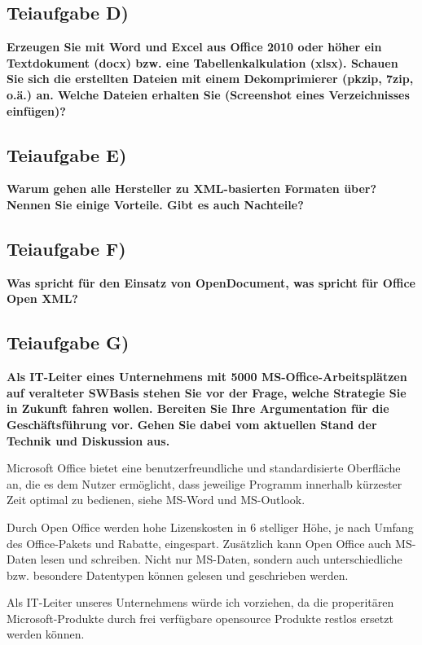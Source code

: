 \subsection{Teiaufgabe D)}
\textbf{Erzeugen Sie mit Word und Excel aus Office 2010 oder höher ein Textdokument (docx)
bzw. eine Tabellenkalkulation (xlsx). Schauen Sie sich die erstellten Dateien mit einem
Dekomprimierer (pkzip, 7zip, o.ä.) an. Welche Dateien erhalten Sie (Screenshot eines
Verzeichnisses einfügen)?}



\subsection{Teiaufgabe E)}
\textbf{Warum gehen alle Hersteller zu XML-basierten Formaten über? Nennen Sie einige
Vorteile. Gibt es auch Nachteile?}


\subsection{Teiaufgabe F)}
\textbf{Was spricht für den Einsatz von OpenDocument, was spricht für Office Open XML?}


\subsection{Teiaufgabe G)}
\textbf{Als IT-Leiter eines Unternehmens mit 5000 MS-Office-Arbeitsplätzen auf veralteter SWBasis
stehen Sie vor der Frage, welche Strategie Sie in Zukunft fahren wollen. Bereiten
Sie Ihre Argumentation für die Geschäftsführung vor. Gehen Sie dabei vom aktuellen
Stand der Technik und Diskussion aus.}

Microsoft Office bietet eine benutzerfreundliche und standardisierte Oberfläche
an, die es dem Nutzer ermöglicht, dass jeweilige Programm innerhalb kürzester
Zeit optimal zu bedienen, siehe MS-Word und MS-Outlook.

Durch Open Office werden hohe Lizenskosten in 6  stelliger Höhe, je nach
Umfang des Office-Pakets und Rabatte, eingespart. Zusätzlich kann Open Office
auch MS-Daten lesen und schreiben. Nicht nur MS-Daten, sondern auch
unterschiedliche bzw. besondere Datentypen können gelesen und geschrieben werden.

Als IT-Leiter unseres Unternehmens würde ich   vorziehen, da die properitären Microsoft-Produkte durch frei verfügbare
opensource Produkte restlos ersetzt werden können.

\clearpage 